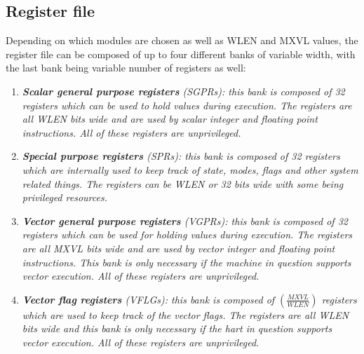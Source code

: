 \documentclass{article}
\begin{document}
        \subsection{Register file}

            Depending on which modules are chosen as well as WLEN and MXVL values, the register file can be composed of up to four different banks of variable width, with the last bank being variable number of registers as well:

            \begin{enumerate}

                \item \textit{\textbf{Scalar general purpose registers} (SGPRs): this bank is composed of 32 registers which can be used to hold values during execution. The registers are all WLEN bits wide and are used by scalar integer and floating point instructions. All of these registers are unprivileged.}

                \item \textit{\textbf{Special purpose registers} (SPRs): this bank is composed of 32 registers which are internally used to keep track of state, modes, flags and other system related things. The registers can be WLEN or 32 bits wide with some being privileged resources.}

                \item \textit{\textbf{Vector general purpose registers} (VGPRs): this bank is composed of 32 registers which can be used for holding values during execution. The registers are all MXVL bits wide and are used by vector integer and floating point instructions. This bank is only necessary if the machine in question supports vector execution. All of these registers are unprivileged.}

                \item \textit{\textbf{Vector flag registers} (VFLGs): this bank is composed of \((\frac{MXVL}{WLEN})\) registers which are used to keep track of the vector flags. The registers are all WLEN bits wide and this bank is only necessary if the hart in question supports vector execution. All of these registers are unprivileged.}

            \end{enumerate}

            \vspace{10pt}
            
            \vspace{10pt}
\end{document}
